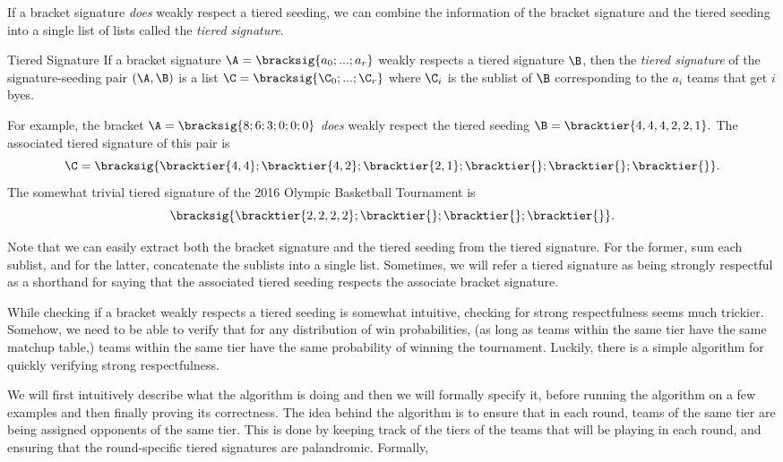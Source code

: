 {    

    If a bracket signature \textit{does} weakly respect a tiered seeding, we can combine the information of the bracket signature and the tiered seeding into a single list of lists called the \textit{tiered signature}.

    \begin{definition}{Tiered Signature}{}
        If a bracket signature $\A = \bracksig{a_0; ...; a_r}$ weakly respects a tiered signature $\B$, then the \textit{tiered signature} of the signature-seeding pair $(\A, \B)$ is a list $\C = \bracksig{\C_0; ...; \C_r}$ where $\C_i$ is the sublist of $\B$ corresponding to the $a_i$ teams that get $i$ byes.
    \end{definition}

    For example, the bracket $\A = \bracksig{8;6;3;0;0;0}$ \textit{does} weakly respect the tiered seeding $\B = \bracktier{4,4,4,2,2,1}.$ The associated tiered signature of this pair is $$\C = \bracksig{\bracktier{4, 4};\bracktier{4,2};\bracktier{2,1};\bracktier{};\bracktier{};\bracktier{}}.$$ The somewhat trivial tiered signature of the 2016 Olympic Basketball Tournament is $$\bracksig{\bracktier{2, 2, 2, 2};\bracktier{};\bracktier{};\bracktier{}}.$$

    Note that we can easily extract both the bracket signature and the tiered seeding from the tiered signature. For the former, sum each sublist, and for the latter, concatenate the sublists into a single list. Sometimes, we will refer a tiered signature as being strongly respectful as a shorthand for saying that the associated tiered seeding respects the associate bracket signature.

    While checking if a bracket weakly respects a tiered seeding is somewhat intuitive, checking for strong respectfulness seems much trickier. Somehow, we need to be able to verify that for any distribution of win probabilities, (as long as teams within the same tier have the same matchup table,) teams within the same tier have the same probability of winning the tournament. Luckily, there is a simple algorithm for quickly verifying strong respectfulness.
    
    We will first intuitively describe what the algorithm is doing and then we will formally specify it, before running the algorithm on a few examples and then finally proving its correctness. The idea behind the algorithm is to ensure that in each round, teams of the same tier are being assigned opponents of the same tier. This is done by keeping track of the tiers of the teams that will be playing in each round, and ensuring that the round-specific tiered signatures are palandromic. Formally,

}
